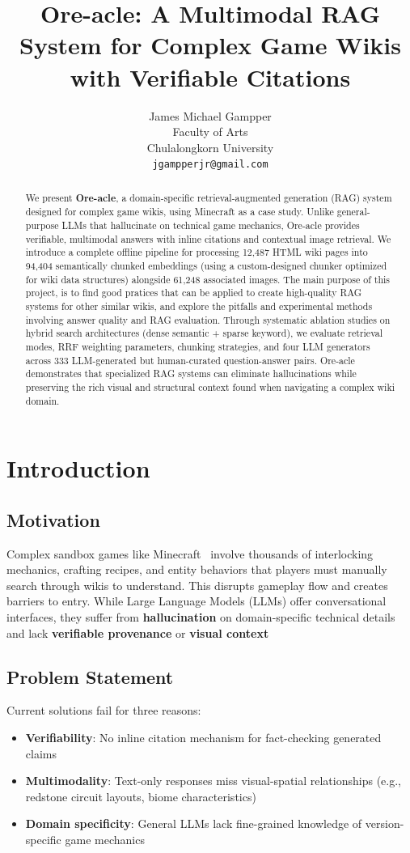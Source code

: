 \documentclass[11pt,a4paper]{article}
\title{Ore-acle: A Multimodal RAG System for Complex Game Wikis with Verifiable Citations}
\author{James Michael Gampper \\
  Faculty of Arts \\
  Chulalongkorn University \\
  \texttt{jgampperjr@gmail.com}}
\date{}
\begin{document}
\maketitle

\begin{abstract}
We present \textbf{Ore-acle}, a domain-specific retrieval-augmented generation (RAG) system designed for complex game wikis, using Minecraft as a case study. Unlike general-purpose LLMs that hallucinate on technical game mechanics, Ore-acle provides verifiable, multimodal answers with inline citations and contextual image retrieval. We introduce a complete offline pipeline for processing 12,487 HTML wiki pages into 94,404 semantically chunked embeddings (using a custom-designed chunker optimized for wiki data structures) alongside 61,248 associated images. The main purpose of this project, is to find good pratices that can be applied to create high-quality RAG systems for other similar wikis, and explore the pitfalls and experimental methods involving answer quality and RAG evaluation. Through systematic ablation studies on hybrid search architectures (dense semantic + sparse keyword), we evaluate retrieval modes, RRF weighting parameters, chunking strategies, and four LLM generators across 333 LLM-generated but human-curated question-answer pairs. Ore-acle demonstrates that specialized RAG systems can eliminate hallucinations while preserving the rich visual and structural context found when navigating a complex wiki domain.
\end{abstract}

\section{Introduction}

\subsection{Motivation}
Complex sandbox games like Minecraft~\cite{minecraft2011} involve thousands of interlocking mechanics, crafting recipes, and entity behaviors that players must manually search through wikis to understand. This disrupts gameplay flow and creates barriers to entry. While Large Language Models (LLMs) offer conversational interfaces, they suffer from \textbf{hallucination} on domain-specific technical details and lack \textbf{verifiable provenance} or \textbf{visual context}

\subsection{Problem Statement}
Current solutions fail for three reasons:
\begin{itemize}
    \item \textbf{Verifiability}: No inline citation mechanism for fact-checking generated claims
    \item \textbf{Multimodality}: Text-only responses miss visual-spatial relationships (e.g., redstone circuit layouts, biome characteristics)
    \item \textbf{Domain specificity}: General LLMs lack fine-grained knowledge of version-specific game mechanics
\end{itemize}
\end{document}
